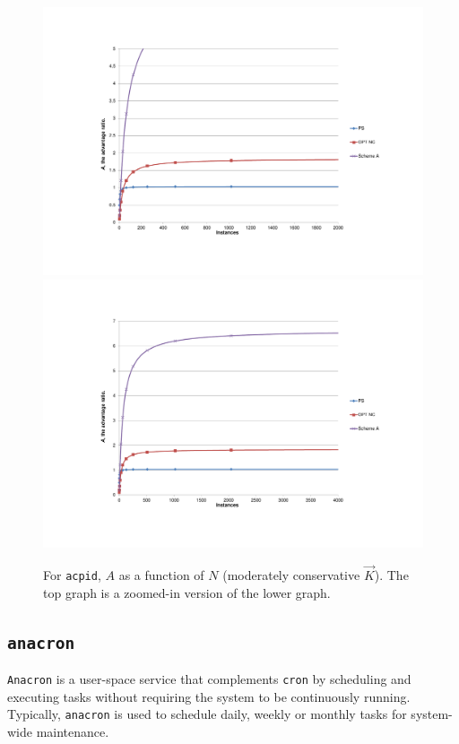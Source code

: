 \begin{figure}
  \centering
  \subfloat%
           {\includegraphics[scale=0.75, trim=5cm 3cm 0cm 4.5cm]{acpid-2.pdf} \label{acpid2}} \\
  \subfloat%
           {\includegraphics[scale=0.75, trim=5cm 3cm 0cm 3cm]{acpid-3.pdf} \label{acpid3}} 
  \caption[For \texttt{acpid}, $A$ as a function of $N$ (moderately conservative $\vec K$)]%
          {For \texttt{acpid}, $A$ as a function of $N$ (moderately conservative $\vec K$).
          The top graph is a zoomed-in version of the lower graph.}
  \label{acpid23}
\end{figure}


\subsection{\texttt{anacron}}
\texttt{Anacron} is a user-space service
that complements \texttt{cron} by scheduling 
and executing tasks without requiring
the system to be continuously running.
Typically, \texttt{anacron} is used
to schedule daily, weekly or monthly
tasks for system-wide maintenance.

